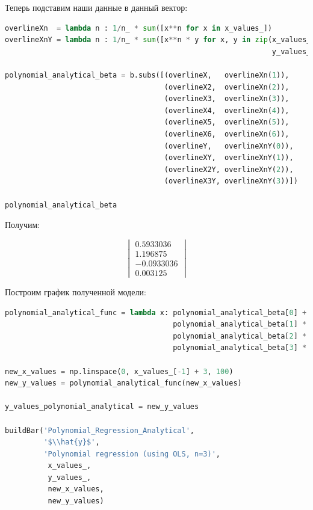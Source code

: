 \documentclass[a4paper, 14pt]{extarticle}
\begin{document}
\newpage

Теперь подставим наши данные в данный вектор:

\begin{center}
    \begin{lstlisting}[language=Python]
overlineXn  = lambda n : 1/n_ * sum([x**n for x in x_values_])
overlineXnY = lambda n : 1/n_ * sum([x**n * y for x, y in zip(x_values_, 
                                                              y_values_)])

polynomial_analytical_beta = b.subs([(overlineX,   overlineXn(1)), 
                                     (overlineX2,  overlineXn(2)), 
                                     (overlineX3,  overlineXn(3)), 
                                     (overlineX4,  overlineXn(4)), 
                                     (overlineX5,  overlineXn(5)), 
                                     (overlineX6,  overlineXn(6)),
                                     (overlineY,   overlineXnY(0)),
                                     (overlineXY,  overlineXnY(1)),
                                     (overlineX2Y, overlineXnY(2)),
                                     (overlineX3Y, overlineXnY(3))])

polynomial_analytical_beta
    \end{lstlisting}
\end{center}

Получим:

\begin{equation*}
    \begin{vmatrix}
        0.5933036 \\
        1.196875 \\
        -0.0933036 \\
        0.003125
    \end{vmatrix}
\end{equation*}

Построим график полученной модели:

\begin{center}
    \begin{lstlisting}[language=Python]
polynomial_analytical_func = lambda x: polynomial_analytical_beta[0] + \
                                       polynomial_analytical_beta[1] * x + \
                                       polynomial_analytical_beta[2] * x**2 + \
                                       polynomial_analytical_beta[3] * x**3

new_x_values = np.linspace(0, x_values_[-1] + 3, 100)
new_y_values = polynomial_analytical_func(new_x_values)

y_values_polynomial_analytical = new_y_values

buildBar('Polynomial_Regression_Analytical', 
         '$\\hat{y}$', 
         'Polynomial regression (using OLS, n=3)',
          x_values_, 
          y_values_, 
          new_x_values, 
          new_y_values)
    \end{lstlisting}
\end{center}
\end{document}
